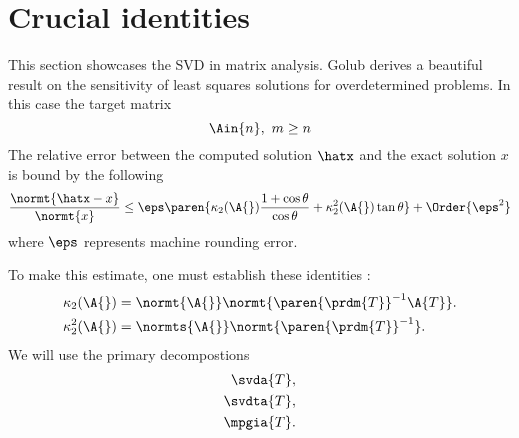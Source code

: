 \section{Crucial identities}
This section showcases the SVD in matrix analysis. Golub \cite[p. 243]{Golub} derives a beautiful result on the sensitivity of least squares solutions for overdetermined problems. In this case the target matrix
\begin{equation}
  \Ain{n}, \ m\ge n
\end{equation}
The relative error between the computed solution $\hatx$ and the exact solution $x$ is bound by the following
\begin{equation}
  \frac{\normt{\hatx - x}}{\normt{x}} \le \eps \paren{\kappa_{2}(\A{}) \frac{1 + \cos \theta} {\cos \theta} + \kappa_{2}^{2}(\A{}) \tan \theta} + \Order{\eps^{2}}
\end{equation}
where $\eps$ represents machine rounding error.

To make this estimate, one must establish these identities \cite[equations 5.3.7, p. 242]{Golub}:
\begin{equation}
  \begin{split}
     \kappa_{2}(\A{})     &= \normt{\A{}}  \normt{\paren{\prdm{T}}^{-1}\A{T}}.\\
     \kappa_{2}^{2}(\A{}) &= \normts{\A{}} \normt{\paren{\prdm{T}}^{-1}}.
  \end{split}
\end{equation}
We will use the primary decompostions
\begin{equation}
  \begin{split}
     \svda{T}, \\
     \svdta{T},\\
     \mpgia{T}.
  \end{split}
\end{equation}

